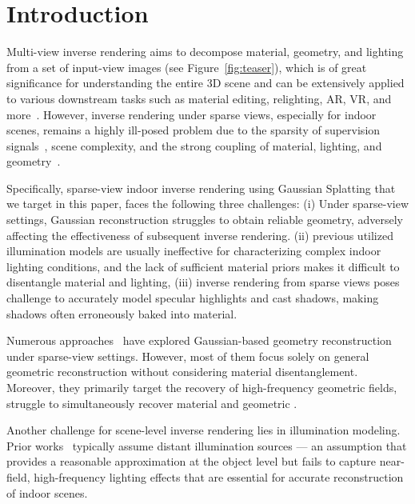 \section{Introduction}
\label{sec:intro}

Multi-view inverse rendering aims to decompose material, geometry, and lighting from a set of input-view images (see Figure~\ref{fig:teaser}), which is of great significance for understanding the entire 3D scene and can be extensively applied to various downstream tasks such as material editing, relighting, AR, VR, and more~\cite{liang2024gs,lai2025glossygs,wang2023prolificdreamer,chung2023luciddreamer,zheng2025dnf}. However, inverse rendering under sparse views, especially for indoor scenes, remains a highly ill-posed problem due to the sparsity of supervision signals~\cite{liao2025spc,wu2025sparse2dgs}, scene complexity, and the strong coupling of material, lighting, and geometry~\cite{du2024gs,liang2024gs}.


Specifically, sparse-view indoor inverse rendering using Gaussian Splatting that we target in this paper, faces the following three challenges: (i) Under sparse-view settings, Gaussian reconstruction struggles to obtain reliable geometry, adversely affecting the effectiveness of subsequent inverse rendering. (ii) previous utilized illumination models are usually ineffective for characterizing complex indoor lighting conditions, and the lack of sufficient material priors makes it difficult to disentangle material and lighting, (iii) inverse rendering from sparse views poses challenge to accurately model specular highlights and cast shadows, making shadows  often erroneously baked into material.

Numerous approaches~\cite{wang2024use,wu2025sparse2dgs,zhu2024fsgs,fan2024instantsplat,bao2025free360,wang2024freesplat,wu2024reconfusion,wu2025difix3d+,liu20243dgs} have explored Gaussian-based geometry reconstruction under sparse-view settings. However, most of them focus solely on general geometric reconstruction without considering material disentanglement. Moreover, they primarily target the recovery of high-frequency geometric fields, struggle to simultaneously recover material and geometric \cite{liao2025spc}. 

Another challenge for scene-level inverse rendering lies in illumination modeling. Prior works~\cite{liang2024gs,chen2024gi,sun2025svg,gu2025irgs,ye2025geosplatting,gao2024relightable,lai2025glossygs,du2024gs} typically assume distant illumination sources --- an assumption that provides a reasonable approximation at the object level but fails to capture near-field, high-frequency lighting effects that are essential for accurate reconstruction of indoor scenes. 



